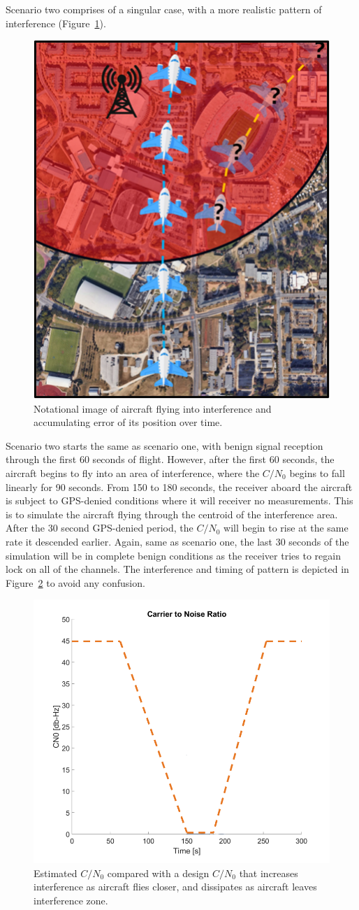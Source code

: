 Scenario two comprises of a singular case, with a more realistic pattern of interference (Figure~\ref{fig:notationalinterference}).

\begin{figure}[!ht]
    \centering
    \includegraphics[width=0.4\linewidth]{Figures/notationalinterference.png}
    \caption{Notational image of aircraft flying into interference and accumulating error of its position over time.}\label{fig:notationalinterference}
\end{figure}

Scenario two starts the same as scenario one, with benign signal reception through the first 60 seconds of flight. However, after the first 60 seconds, the aircraft begins to fly into an area of interference, where the \(C/N_0\) begins to fall linearly for 90 seconds. From 150 to 180 seconds, the receiver aboard the aircraft is subject to GPS-denied conditions where it will receiver no measurements. This is to simulate the aircraft flying through the centroid of the interference area. After the 30 second GPS-denied period, the \(C/N_0\) will begin to rise at the same rate it descended earlier. Again, same as scenario one, the last 30 seconds of the simulation will be in complete benign conditions as the receiver tries to regain lock on all of the channels. The interference and timing of pattern is depicted in Figure~\ref{fig:CN0scene2} to avoid any confusion.

\begin{figure}[!ht]
    \centering
    \includegraphics[width=0.75\linewidth]{Figures/Results/CN0scene2.png}
    \caption{Estimated \(C/N_0\) compared with a design \(C/N_0\) that increases interference as aircraft flies closer, and dissipates as aircraft leaves interference zone. }\label{fig:CN0scene2}
\end{figure}

